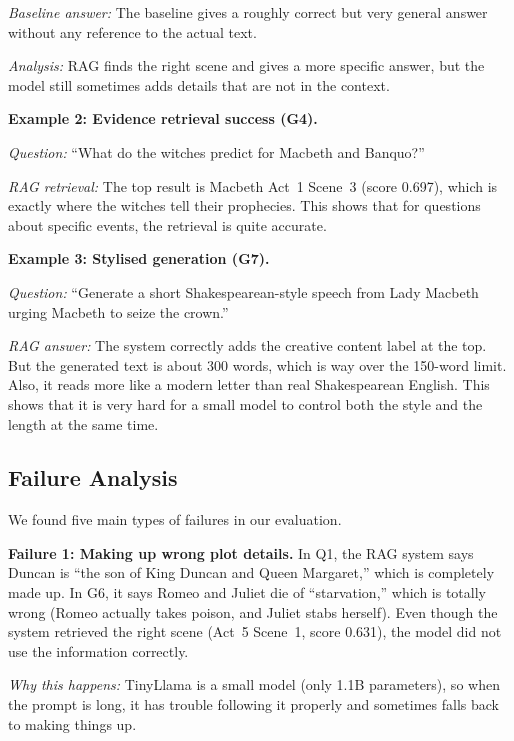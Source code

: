 \documentclass[10pt,conference]{IEEEtran}
\begin{document}
\textit{Baseline answer:} The baseline gives a roughly correct but very general answer without any reference to the actual text.

\textit{Analysis:} RAG finds the right scene and gives a more specific answer, but the model still sometimes adds details that are not in the context.

\medskip

\textbf{Example 2: Evidence retrieval success (G4).}

\textit{Question:} ``What do the witches predict for Macbeth and Banquo?''

\textit{RAG retrieval:} The top result is Macbeth Act~1 Scene~3 (score 0.697), which is exactly where the witches tell their prophecies. This shows that for questions about specific events, the retrieval is quite accurate.

\medskip

\textbf{Example 3: Stylised generation (G7).}

\textit{Question:} ``Generate a short Shakespearean-style speech from Lady Macbeth urging Macbeth to seize the crown.''

\textit{RAG answer:} The system correctly adds the creative content label at the top. But the generated text is about 300 words, which is way over the 150-word limit. Also, it reads more like a modern letter than real Shakespearean English. This shows that it is very hard for a small model to control both the style and the length at the same time.

\subsection{Failure Analysis}

We found five main types of failures in our evaluation.

\textbf{Failure 1: Making up wrong plot details.}
In Q1, the RAG system says Duncan is ``the son of King Duncan and Queen Margaret,'' which is completely made up. In G6, it says Romeo and Juliet die of ``starvation,'' which is totally wrong (Romeo actually takes poison, and Juliet stabs herself). Even though the system retrieved the right scene (Act~5 Scene~1, score 0.631), the model did not use the information correctly.

\textit{Why this happens:} TinyLlama is a small model (only 1.1B parameters), so when the prompt is long, it has trouble following it properly and sometimes falls back to making things up.
\end{document}
